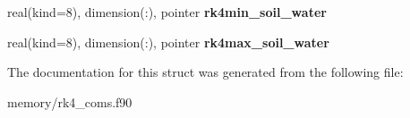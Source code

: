 \begin{DoxyCompactItemize}
\item 
\hypertarget{structrk4__coms_1_1rk4auxtype_a58d2f4950f4f2255921937aebb093b0f}{
real(kind=8), dimension(:), pointer {\bfseries rk4min\_\-soil\_\-water}}
\label{structrk4__coms_1_1rk4auxtype_a58d2f4950f4f2255921937aebb093b0f}

\item 
\hypertarget{structrk4__coms_1_1rk4auxtype_af9539b27fd51316dc92a960e60aa693a}{
real(kind=8), dimension(:), pointer {\bfseries rk4max\_\-soil\_\-water}}
\label{structrk4__coms_1_1rk4auxtype_af9539b27fd51316dc92a960e60aa693a}

\end{DoxyCompactItemize}


The documentation for this struct was generated from the following file:\begin{DoxyCompactItemize}
\item 
memory/rk4\_\-coms.f90\end{DoxyCompactItemize}
